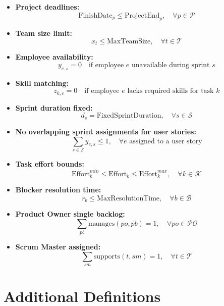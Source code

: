 \documentclass{article}
\begin{document}
\begin{itemize}
    \item \textbf{Project deadlines:} 
    \[
    \text{FinishDate}_p \leq \text{ProjectEnd}_p, \quad \forall p \in \mathcal{P}
    \]

    \item \textbf{Team size limit:}
    \[
    x_t \leq \text{MaxTeamSize}, \quad \forall t \in \mathcal{T}
    \]

    \item \textbf{Employee availability:}
    \[
    y_{e,s} = 0 \quad \text{if employee } e \text{ unavailable during sprint } s
    \]

    \item \textbf{Skill matching:}
    \[
    z_{k,e} = 0 \quad \text{if employee } e \text{ lacks required skills for task } k
    \]

    \item \textbf{Sprint duration fixed:}
    \[
    d_s = \text{FixedSprintDuration}, \quad \forall s \in \mathcal{S}
    \]

    \item \textbf{No overlapping sprint assignments for user stories:}
    \[
    \sum_{s \in \mathcal{S}} y_{e,s} \leq 1, \quad \forall e \text{ assigned to a user story}
    \]

    \item \textbf{Task effort bounds:}
    \[
    \text{Effort}_{k}^{min} \leq \text{Effort}_k \leq \text{Effort}_{k}^{max}, \quad \forall k \in \mathcal{K}
    \]

    \item \textbf{Blocker resolution time:}
    \[
    r_b \leq \text{MaxResolutionTime}, \quad \forall b \in \mathcal{B}
    \]

    \item \textbf{Product Owner single backlog:}
    \[
    \sum_{pb} \text{manages}(po, pb) = 1, \quad \forall po \in \mathcal{PO}
    \]

    \item \textbf{Scrum Master assigned:}
    \[
    \sum_{sm} \text{supports}(t, sm) = 1, \quad \forall t \in \mathcal{T}
    \]
\end{itemize}

\section*{Additional Definitions}
\end{document}
